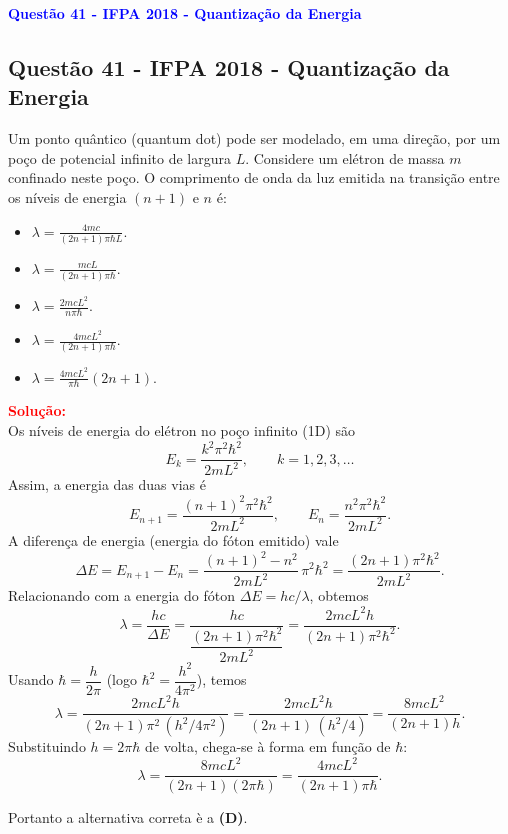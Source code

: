 \begin{flushleft}
\textbf{\textcolor{blue}{\Large Quest\~ao 41 - IFPA 2018 - Quantiza\c{c}\~ao da Energia}}\\
\noindent

\subsection{Quest\~ao 41 - IFPA 2018 - Quantiza\c{c}\~ao da Energia}

Um ponto quântico (quantum dot) pode ser modelado, em uma direção, por um po\c{c}o de potencial infinito de largura $L$. Considere um elétron de massa $m$ confinado neste po\c{c}o. O comprimento de onda da luz emitida na transição entre os níveis de energia $(n+1)$ e $n$ é:

\begin{itemize}
\item[(A)] $\displaystyle \lambda=\frac{4mc}{(2n+1)\pi\hbar L}.$
\item[(B)] $\displaystyle \lambda=\frac{mcL}{(2n+1)\pi\hbar}.$
\item[(C)] $\displaystyle \lambda=\frac{2mcL^2}{n\pi\hbar}.$
\item[(D)] $\displaystyle \lambda=\frac{4mcL^2}{(2n+1)\pi\hbar}.$
\item[(E)] $\displaystyle \lambda=\frac{4mcL^2}{\pi\hbar}(2n+1).$
\end{itemize}

\vspace{0.5cm}

\textcolor{red}{\textbf{Solu\c{c}\~ao:}}\\

Os níveis de energia do elétron no po\c{c}o infinito (1D) s\~ao
\[
E_k=\frac{k^2\pi^2\hbar^2}{2mL^2},\qquad k=1,2,3,\dots
\]
Assim, a energia das duas vias é
\[
E_{n+1}=\frac{(n+1)^2\pi^2\hbar^2}{2mL^2},\qquad
E_{n}=\frac{n^2\pi^2\hbar^2}{2mL^2}.
\]
A diferen\c{c}a de energia (energia do fóton emitido) vale
\[
\Delta E=E_{n+1}-E_n=\frac{(n+1)^2-n^2}{2mL^2}\,\pi^2\hbar^2
=\frac{(2n+1)\pi^2\hbar^2}{2mL^2}.
\]
Relacionando com a energia do fóton $\Delta E=h c/\lambda$, obtemos
\[
\lambda=\frac{h c}{\Delta E}
=\frac{h c}{\dfrac{(2n+1)\pi^2\hbar^2}{2mL^2}}
=\frac{2m c L^2 h}{(2n+1)\pi^2\hbar^2}.
\]
Usando $\hbar=\dfrac{h}{2\pi}$ (logo $\hbar^2=\dfrac{h^2}{4\pi^2}$), temos
\[
\lambda=\frac{2m c L^2 h}{(2n+1)\pi^2\,(h^2/4\pi^2)}
=\frac{2m c L^2 h}{(2n+1)\,(h^2/4)}
=\frac{8 m c L^2}{(2n+1)h}.
\]
Substituindo $h=2\pi\hbar$ de volta, chega-se à forma em fun\c{c}\~ao de $\hbar$:
\[
\lambda=\frac{8 m c L^2}{(2n+1)(2\pi\hbar)}
=\frac{4 m c L^2}{(2n+1)\pi\hbar}.
\]

Portanto a alternativa correta \`e a \colorbox{green!50}{\textbf{(D)}}.

\end{flushleft}


